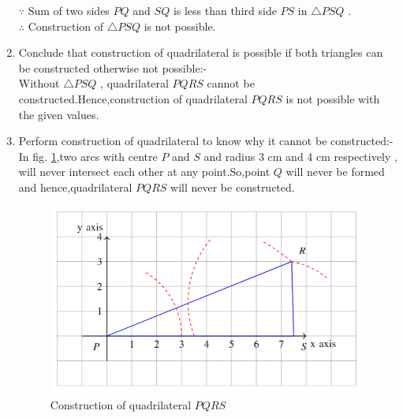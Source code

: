 \documentclass[journal,12pt,twocolumn]{IEEEtran}
\begin{document}
\begin{enumerate}
    $\because$ Sum of two sides $PQ$ and $SQ$ is less than third side $PS$ in $\triangle PSQ$ .
    \\
    $\therefore$ Construction of $\triangle PSQ$ is not possible.
    
    \item Conclude that construction of quadrilateral is possible if both triangles can be constructed otherwise not possible:-
    \\
    Without $\triangle PSQ$ , quadrilateral $PQRS$ cannot be constructed.Hence,construction of quadrilateral $PQRS$ is not possible with the given values.
    
    \item Perform construction of quadrilateral to know why it cannot be constructed:-
    \\
    In fig. \ref{fig:const_quadrilateral},two arcs with centre $P$ and $S$ and radius 3 cm and 4 cm respectively , will never intersect each other at any point.So,point $Q$ will never be formed and hence,quadrilateral $PQRS$ will never be constructed.
    
    \begin{figure}[!ht]
    \centering
    \includegraphics[width=\columnwidth]{Figure2}
    \caption{Construction of quadrilateral $PQRS$}
    \label{fig:const_quadrilateral}	
    \end{figure}
  
\end{enumerate}
\end{document}
